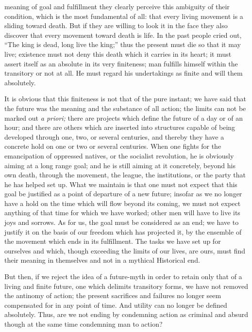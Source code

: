 \documentclass[11pt]{article}
\begin{document}
{{meaning of goal and fulfillment they clearly perceive this ambiguity of their condition, which is the most fundamental of all: that every living movement is a sliding toward death. But if they are willing to look it in the face they also discover that every movement toward death is life. In the past people cried out, “The king is dead, long live the king;” thus the present must die so that it may live; existence must not deny this death which it carries in its heart; it must assert itself as an absolute in its very finiteness; man fulfills himself within the transitory or not at all. He must regard his undertakings as finite and will them absolutely.

It is obvious that this finiteness is not that of the pure instant; we have said that the future was the meaning and the substance of all action; the limits can not be marked out \textit{a priori; }there are projects which define the future of a day or of an hour; and there are others which are inserted into structures capable of being developed through one, two, or several centuries, and thereby they have a concrete hold on one or two or several centuries. When one fights for the emancipation of oppressed natives, or the socialist revolution, he is obviously aiming at a long range goal; and he is still aiming at it concretely, beyond his own death, through the movement, the league, the institutions, or the party that he has helped set up. What we maintain is that one must not expect that this goal be justified as a point of departure of a new future; insofar as we no longer have a hold on the time which will flow beyond its coming, we must not expect anything of that time for which we have worked; other men will have to live its joys and sorrows. As for us, the goal must be considered as an end; we have to justify it on the basis of our freedom which has projected it, by the ensemble of the movement which ends in its fulfillment. The tasks we have set up for ourselves and which, though exceeding the limits of our lives, are ours, must find their meaning in themselves and not in a mythical Historical end.

But then, if we reject the idea of a future-myth in order to retain only that of a living and finite future, one which delimits transitory forms, we have not removed the antinomy of action; the present sacrifices and failures no longer seem compensated for in any point of time. And utility can no longer be defined absolutely. Thus, are we not ending by condemning action as criminal and absurd though at the same time condemning man to action?
}}
\end{document}
